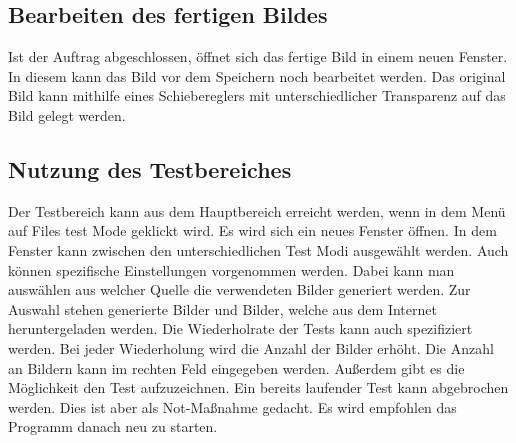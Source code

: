 \newpage
\subsection*{Bearbeiten des fertigen Bildes}
Ist der Auftrag abgeschlossen, öffnet sich das fertige Bild in einem neuen Fenster. In diesem kann das Bild vor dem Speichern noch bearbeitet werden. Das original Bild kann mithilfe eines Schiebereglers mit unterschiedlicher Transparenz auf das Bild gelegt werden.
\begin{figure}[h]
    \centering
    \label{fertig}
\end{figure}

\subsection*{Nutzung des Testbereiches}
Der Testbereich kann aus dem Hauptbereich erreicht werden, wenn in dem Menü auf Files \textrightarrow test Mode geklickt wird. Es wird sich ein neues Fenster öffnen. In dem Fenster kann zwischen den unterschiedlichen Test Modi ausgewählt werden. Auch können spezifische Einstellungen vorgenommen werden. Dabei kann man auswählen aus welcher Quelle die verwendeten Bilder generiert werden. Zur Auswahl stehen generierte Bilder und Bilder, welche aus dem Internet heruntergeladen werden. Die Wiederholrate der Tests kann auch spezifiziert werden. Bei jeder Wiederholung wird die Anzahl der Bilder erhöht. Die Anzahl an Bildern kann im rechten Feld eingegeben werden. Außerdem gibt es die Möglichkeit den Test aufzuzeichnen. Ein bereits laufender Test kann abgebrochen werden. Dies ist aber als Not-Maßnahme gedacht. Es wird empfohlen das Programm danach neu zu starten.

